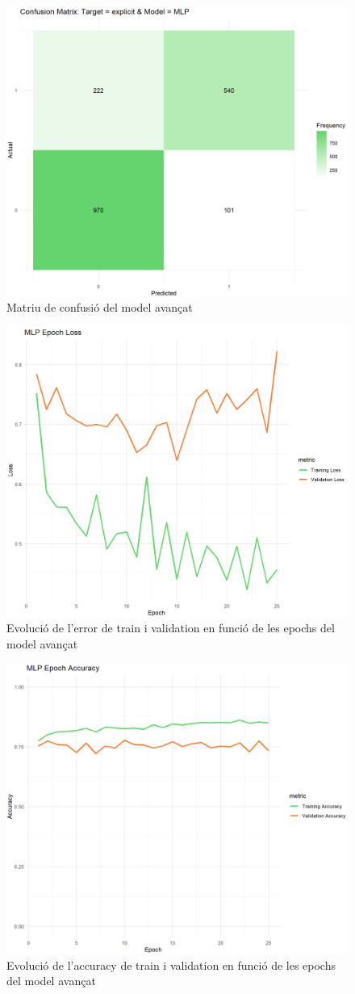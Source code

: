 \begin{figure}[H]
    \centering
    \includegraphics[width=0.8\linewidth]{Images/6_Factorial_Methods/NN/cm_mlp.png}
    \caption{Matriu de confusió del model avançat}
    \label{fig:6_FM:NN_cm_mlp}
\end{figure}

\begin{figure}[H]
    \centering
    \includegraphics[width=0.65\linewidth]{Images/6_Factorial_Methods/NN/loss_mlp.png}
    \caption{Evolució de l'error de train i validation en funció de les epochs del model avançat}
    \label{fig:6_FM:NN_loss_mlp}
\end{figure}

\begin{figure}[H]
    \centering
    \includegraphics[width=0.65\linewidth]{Images/6_Factorial_Methods/NN/acc_mlp.png}
    \caption{Evolució de l'accuracy de train i validation en funció de les epochs del model avançat}
    \label{fig:6_FM:NN_acc_mlp}
\end{figure}

